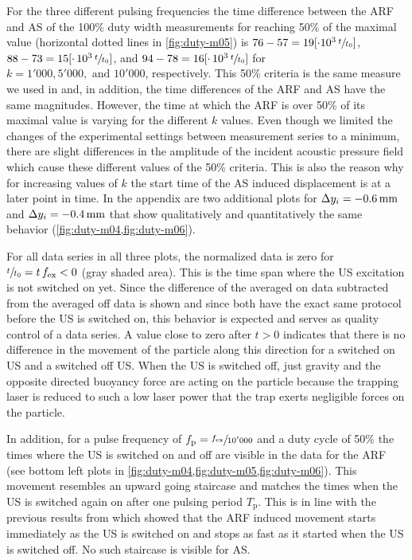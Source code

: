 For the three different pulsing frequencies the time difference between the ARF 
and AS of the 100\% duty width measurements for reaching 50\% of the maximal 
value (horizontal dotted lines in \cref{fig:duty-m05}) is $76-57=19[\cdot 
10^{3}\,\sfrac{t}{t_{0}}]$, $88-73=15[\cdot\,10^{3}\,\sfrac{t}{t_{0}}]$, and 
$94-78=16[\cdot\,10^{3}\,\sfrac{t}{t_{0}}]$ for $k=1'000, 5'000,\text{ and } 
10'000$, respectively. This 50\% criteria is the same measure we used in 
\cite{Goering2021} and, in addition, the time differences of the ARF and AS 
have the same magnitudes. However, the time at which the ARF is over 50\% of 
its maximal value is varying for the different $k$ values. Even though we 
limited the changes of the experimental settings between measurement series to 
a minimum, there are slight differences in the amplitude of the incident 
acoustic pressure field which cause these different values of the 50\% 
criteria. This is also the reason why for increasing values of $k$  the start 
time of the AS induced displacement is at a later point in time. In the 
appendix are two additional plots for $\Dy_{i} = \SI{-0.6}{\mm}$ and $\Dy_{i}= 
\SI{-0.4}{\mm}$ that show qualitatively and quantitatively the same behavior 
(\cref{fig:duty-m04,fig:duty-m06}).

For all data series in all three plots, the normalized data is zero for 
$\sfrac{t}{t_{0}}=t\,f_{\mathrm{ex}}<0$ (gray shaded area). This is the time span where 
the US excitation is not switched on yet. Since the difference of the averaged 
on data subtracted from the averaged off data is shown and since both have the 
exact same protocol before the US is switched on, this behavior is expected and 
serves as quality control of a data series. A value close to zero after $t>0$ 
indicates that there is no difference in the movement of the particle along 
this direction for a switched on US and a switched off US. When the US is 
switched off, just gravity and the opposite directed buoyancy force are acting 
on the particle because the trapping laser is reduced to such a low laser power 
that the trap exerts negligible forces on the particle.

In addition, for a pulse frequency of $f_{\mathrm{p}}=\sfrac{f_{\mathrm{ex}}}{10'000}$ and a duty 
cycle of 50\% the times where the US is switched on and off are visible in the 
data for the ARF (see bottom left plots in
\cref{fig:duty-m04,fig:duty-m05,fig:duty-m06}). This movement resembles an 
upward going staircase and matches the times when the US is switched again on 
after one pulsing period $T_{\mathrm{p}}$. This is in line with the previous 
results from \cite{Goering2021} which showed that the ARF induced movement 
starts immediately as the US is switched on and stops as fast as it started 
when the US is switched off. No such staircase is visible for AS.

